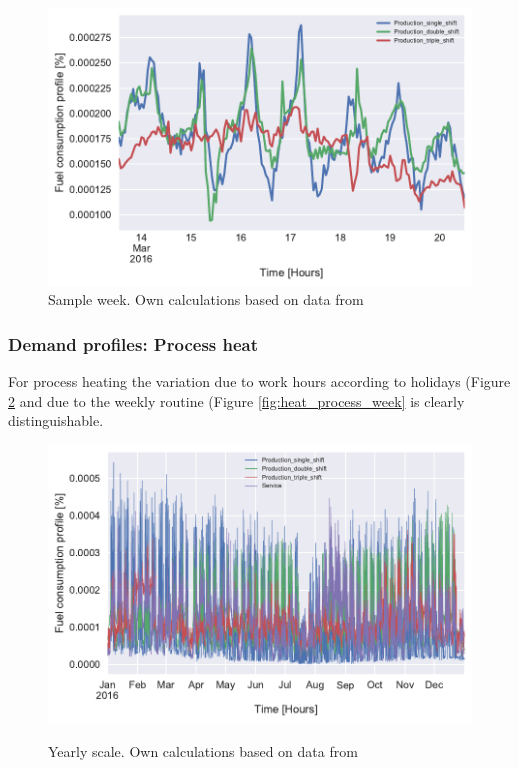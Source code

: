 \documentclass[review]{elsarticle}
\begin{document}
\begin{figure}[H]
\centering
\includegraphics[width=\linewidth]{Img/profiles/heatprofile_space_week_perc_noserv.pdf}
\caption{Sample week. Own calculations based on data from \cite{DanskGasDistribution2016,VM2015}}
\label{fig:heat_space_week}
\end{figure}

\subsubsection{Demand profiles: Process heat}
For process heating the variation due to work hours according to holidays (Figure \ref{fig:heat_process_year} and due to the weekly routine (Figure \ref{fig:heat_process_week} is clearly distinguishable.

\begin{figure}[H]
\centering
\includegraphics[width=\linewidth]{Img/profiles/heatprofile_process_year_perc.pdf}\\
\caption{Yearly scale. Own calculations based on data from \cite{DanskGasDistribution2016,VM2015}}
\label{fig:heat_process_year}
\end{figure}
	
\end{document}
